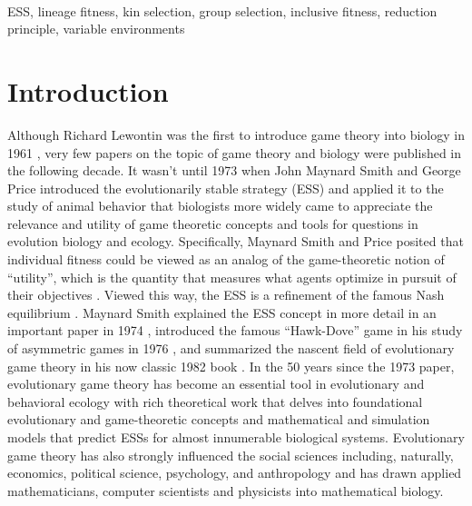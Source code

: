 \documentclass[11pt]{article}
\begin{document}
\vspace{3em}
\\
ESS, lineage fitness, kin selection, group selection, inclusive fitness, reduction principle, variable environments

\clearpage
\section{Introduction}

Although Richard Lewontin was the first to introduce game theory into biology in 1961 \cite{Lewontin:1961}, very few papers on the topic of game theory and biology were published in the following decade. It wasn't until 1973 when John Maynard Smith and George Price introduced the evolutionarily stable strategy (ESS) and applied it to the study of animal behavior \cite{Maynard-Smith:Price:1973} that biologists more widely came to appreciate the relevance and utility of game theoretic concepts and tools for questions in evolution biology and ecology. Specifically, Maynard Smith and Price posited that individual fitness could be viewed as an analog of the game-theoretic notion of ``utility'', which is the quantity that measures what agents optimize in pursuit of their objectives \cite{Myerson:1991}. Viewed this way, the ESS is a refinement of the famous Nash equilibrium \cite{Nash:1950}. Maynard Smith explained the ESS concept in more detail in an important paper in 1974 \cite{Maynard-Smith:1974}, introduced the famous ``Hawk-Dove'' game in his study of asymmetric games in 1976 \cite{Maynard-Smith:Parker:1976}, and summarized the nascent field of evolutionary game theory in his now classic 1982 book \cite{MaynardSmith:1982}. In the 50 years since the 1973 paper, evolutionary game theory has become an essential tool in evolutionary and behavioral ecology with rich theoretical work that delves into foundational evolutionary and game-theoretic concepts and mathematical and simulation models that predict ESSs for almost innumerable biological systems. Evolutionary game theory has also strongly influenced the social sciences including, naturally, economics, political science, psychology, and anthropology and has drawn applied mathematicians, computer scientists and physicists into mathematical biology.
\end{document}
